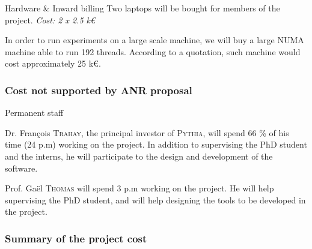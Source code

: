 \documentclass[a4paper,11pt,defblank]{article}
\newcommand{\todo}[1]{\mynote{TODO}{#1}}
\newcommand{\pname}{\textsc{Pythia}\xspace}
\begin{document}
\begin{paragraph}{Hardware \& Inward billing}
  Two laptops will be bought for members of the project. \emph{Cost: 2 x 2.5 k\euro}

  In order to run experiments on a large scale machine, we will buy a
  large NUMA machine able to run 192 threads. According to a
  quotation, such machine would cost approximately 25 k\euro.
\end{paragraph}

\vspace{0.3cm}
\subsubsection{Cost not supported by ANR proposal}
\begin{paragraph}{Permanent staff}

  Dr. François \textsc{Trahay}, the principal investor of \pname, will
  spend 66 \% of his time (24 p.m) working on the project. In addition
  to supervising the PhD student and the interns, he will participate
  to the design and development of the software.

  Prof. Gaël \textsc{Thomas} will spend 3 p.m working on the
  project. He will help supervising the PhD student, and will help
  designing the tools to be developed in the project.

\end{paragraph}

%
\vspace{0.3cm}
\subsubsection{Summary of the project cost}
\end{document}
